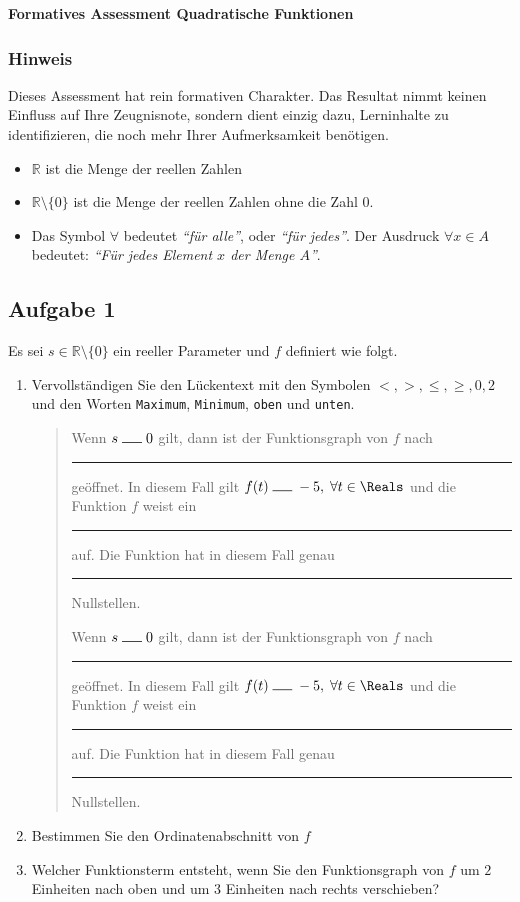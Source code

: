 \documentclass[12pt]{article}
\begin{document}
\begin{center}
\Large \textbf{Formatives Assessment Quadratische Funktionen}\\[1em]
\footnotesize
\end{center}
{\footnotesize
\subsubsection*{Hinweis}
Dieses Assessment hat rein formativen Charakter. Das Resultat nimmt keinen Einfluss auf Ihre Zeugnisnote, sondern dient einzig dazu, Lerninhalte zu identifizieren, die noch mehr Ihrer Aufmerksamkeit benötigen.
\begin{itemize}
\item $\mathbb{R}$ ist die Menge der reellen Zahlen
\item $\mathbb{R} \setminus \{0\}$ ist die Menge der reellen Zahlen ohne die Zahl $0$.
\item Das Symbol $\forall$ bedeutet \emph{``für alle''}, oder \emph{``für jedes''}. Der Ausdruck $\forall x \in A$ bedeutet: \emph{``Für jedes Element $x$ der Menge $A$''}.
\end{itemize}
}
\subsection*{Aufgabe 1}

Es sei $s \in \mathbb{R} \setminus \{0\}$ ein reeller Parameter und $f$ definiert wie folgt. 
\begin{enumerate}[label=\alph*)]
\item Vervollständigen Sie den Lückentext mit den Symbolen $<,>, \leqslant, \geqslant,0,2$ und den Worten \texttt{Maximum}, \texttt{Minimum}, \texttt{oben} und \texttt{unten}.
\begin{quote} \doublespacing
Wenn $s \; \rule{0.5cm}{0.5pt} \; 0$ gilt, dann ist der Funktionsgraph von $f$ nach \rule{2cm}{0.5pt} geöffnet. In diesem Fall gilt $f(t)\; \rule{0.5cm}{0.5pt} \; -5, \; \forall t \in \Reals$ und die Funktion $f$ weist ein \rule{2cm}{0.5pt} auf. Die Funktion hat in diesem Fall genau \rule{0.5cm}{0.5pt} Nullstellen.


Wenn $s \; \rule{0.5cm}{0.5pt} \; 0$ gilt, dann ist der Funktionsgraph von $f$ nach \rule{2cm}{0.5pt} geöffnet. In diesem Fall gilt $f(t)\; \rule{0.5cm}{0.5pt} \; -5, \; \forall t \in \Reals$ und die Funktion $f$ weist ein \rule{2cm}{0.5pt} auf. Die Funktion hat in diesem Fall genau \rule{0.5cm}{0.5pt} Nullstellen.
\end{quote}
\item Bestimmen Sie den Ordinatenabschnitt von $f$
\item Welcher Funktionsterm entsteht, wenn Sie den Funktionsgraph von $f$ um $2$ Einheiten nach oben und um $3$ Einheiten nach rechts verschieben?
\end{enumerate}
\end{document}
